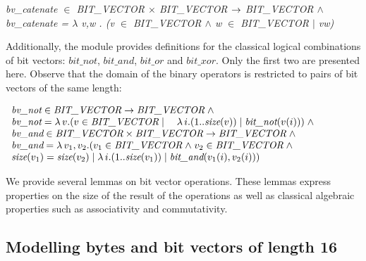 \documentclass[a4paper]{llncs}
\begin{document}
\hspace*{0.00in} \it bv\_catenate  $\in$  \it BIT\_VECTOR  $\times$  \it BIT\_VECTOR  $\rightarrow$ \it
BIT\_VECTOR $\land$\\
\hspace*{0.21in} \it bv\_catenate \rm =  $\lambda$  v\rm ,\it w \rm . \rm (\it v 
$\in$  \it BIT\_VECTOR $\land$ \it w $\in$  \it BIT\_VECTOR  $\mid$  \it v\^ \it w\rm ) %

%
%


Additionally, the module provides definitions for the classical
logical combinations of bit vectors: $\textit{bit\_not}$,
$\textit{bit\_and}$, $\textit{bit\_or}$ and $\textit{bit\_xor}$. Only
the first two are presented here. Observe that the domain of the
binary operators is restricted to pairs of bit vectors of the same
length:

$
\begin{array}{l}
\textit{bv\_not} \in \textit{BIT\_VECTOR} \fun \textit{BIT\_VECTOR} \land \\
\textit{bv\_not} = \lambda v . (v \in \textit{BIT\_VECTOR} \mid \quad \lambda i . (1 .. \textit{size}(v)) \mid \textit{bit\_not}(v(i))) \land \\
\textit{bv\_and} \in \textit{BIT\_VECTOR} \times \textit{BIT\_VECTOR} \fun \textit{BIT\_VECTOR} \land \\
\textit{bv\_and} = \lambda v_1, v_2 . (v_1 \in \textit{BIT\_VECTOR} \land v_2 \in \textit{BIT\_VECTOR} \land \\
\textit{size}(v_1) = \textit{size}(v_2) \mid \lambda i . (1 .. \textit{size}(v_1)) \mid
\textit{bit\_and}(v_1(i), v_2(i)))
\end{array}
$

We provide several lemmas on bit vector operations. These lemmas
express properties on the size of the result of the operations
as well as classical algebraic properties such as associativity
and commutativity.

\subsection{Modelling bytes and bit vectors of length 16}
\label{subsec:HardwareLibrary3}
\end{document}
